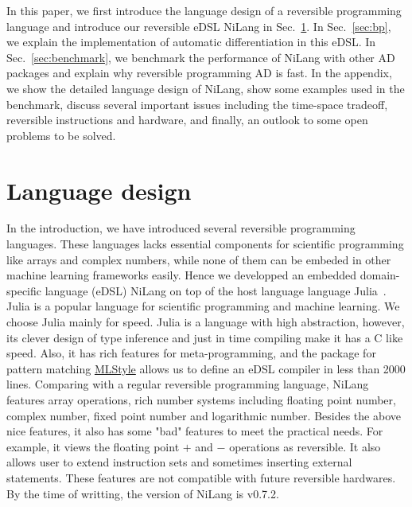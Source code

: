 \documentclass{article}
\newcommand{\<}{\langle}
\renewcommand{\>}{\rangle}
\newcommand{\Sec}[1]{Sec.~\ref{#1}}
\theoremstyle{definition}\newtheorem{definition}{\textit{Definition}}
\begin{document}
    In this paper, we first introduce the language design of a reversible programming language and introduce our reversible eDSL NiLang in \Sec{sec:lang}.
    In \Sec{sec:bp}, we explain the implementation of automatic differentiation in this eDSL.
    In \Sec{sec:benchmark}, we benchmark the performance of NiLang with other AD packages and explain why reversible programming AD is fast.
    In the appendix, we show the detailed language design of NiLang, show some examples used in the benchmark, discuss several important issues including the time-space  tradeoff, reversible instructions and hardware, and finally, an outlook to some open problems to be solved.


\section{Language design}\label{sec:lang}

In the introduction, we have introduced several reversible programming languages. These languages lacks essential components for scientific programming like arrays and complex numbers, while none of them can be embeded in other machine learning frameworks easily.
Hence we developped an embedded domain-specific language (eDSL) NiLang on top of the host language language Julia~\cite{Bezanson2012,Bezanson2017}.
Julia is a popular language for scientific programming and machine learning. We choose Julia mainly for speed. Julia is a language with high abstraction, however, its clever design of type inference and just in time compiling make it has a C like speed.
Also, it has rich features for meta-programming, and the package for pattern matching \href{https://github.com/thautwarm/MLStyle.jl}{MLStyle} allows us to define an eDSL compiler in less than 2000 lines.
Comparing with a regular reversible programming language, NiLang features array operations, rich number systems including floating point number, complex number, fixed point number and logarithmic number.
Besides the above nice features, it also has some "bad" features to meet the practical needs. For example, it views the floating point $\mathrel{+}$ and $\mathrel{-}$ operations as reversible. It also allows user to extend instruction sets and sometimes inserting external statements. These features are not compatible with future reversible hardwares.
By the time of writting, the version of NiLang is v0.7.2.
\end{document}
